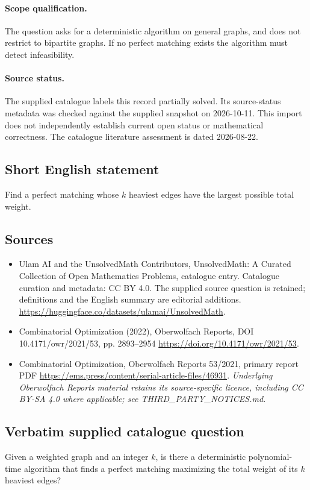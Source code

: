 \documentclass[11pt]{article}
\begin{document}
\paragraph{Scope qualification.}
The question asks for a deterministic algorithm on general graphs, and does not restrict to bipartite graphs. If no perfect matching exists the algorithm must detect infeasibility.
\paragraph{Source status.}
The supplied catalogue labels this record partially solved. Its source-status metadata was checked against the supplied snapshot on 2026-10-11. This import does not independently establish current open status or mathematical correctness. The catalogue literature assessment is dated 2026-08-22.
\subsection{Short English statement}
Find a perfect matching whose $k$ heaviest edges have the largest possible total weight.
\subsection{Sources}
\begin{itemize}
\item[S1] Ulam AI and the UnsolvedMath Contributors, UnsolvedMath: A Curated Collection of Open Mathematics Problems, catalogue entry. Catalogue curation and metadata: CC BY 4.0. The supplied source question is retained; definitions and the English summary are editorial additions.
\url{https://huggingface.co/datasets/ulamai/UnsolvedMath}.
\item[S2] Combinatorial Optimization (2022), Oberwolfach Reports, DOI 10.4171/owr/2021/53, pp. 2893--2954
\url{https://doi.org/10.4171/owr/2021/53}.
\item[S3] Combinatorial Optimization, Oberwolfach Reports 53/2021, primary report PDF
\url{https://ems.press/content/serial-article-files/46931}.
\textit{Underlying Oberwolfach Reports material retains its source-specific licence, including CC BY-SA 4.0 where applicable; see THIRD\_PARTY\_NOTICES.md.}
\end{itemize}
\subsection{Verbatim supplied catalogue question}
Given a weighted graph and an integer $k$, is there a deterministic polynomial-time algorithm that finds a perfect matching maximizing the total weight of its $k$ heaviest edges?
\end{document}

